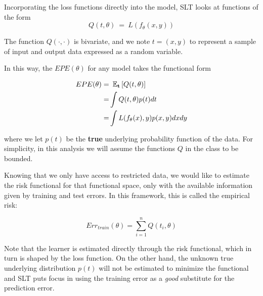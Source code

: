 Incorporating the loss functions directly into the model, SLT looks at functions of the form $$Q(t,\theta) \ = \ L(f_\theta(x,y))$$

The function $Q(\cdot,\cdot)$ is bivariate, and we note $t=(x,y)$ to represent a sample of input and output data expressed as a random variable.%

In this way, the $EPE(\theta)$ for any model takes the functional form


\begin{equation}
\begin{split}
EPE(\theta) = & \ \operatorname{\mathbb{E}}_{\textbf{t}} \left[ Q(t,\theta) \right]\\
= & \int Q(t,\theta) p(t) dt \\
= & \int L(f_\theta(x),y) p(x,y) dx dy
\end{split}
\end{equation}\label{eq:vapnik-risk}

where we let $p(t)$ be the \textbf{true} underlying probability function of the data.
For simplicity, in this analysis we will assume the functions $Q$ in the class to be bounded.

Knowing that we only have access to restricted data, we would like to estimate the risk functional for that functional space, only with the available information given by training and test errors.
In this framework, this is called the empirical risk:

\begin{equation}\label{vapnik-empiricalRisk}
Err_{train}(\theta) = \sum_{i=1}^n Q(t_i,\theta)
\end{equation}

Note that the learner is estimated directly through the risk functional, which in turn is shaped by the loss function.
On the other hand, the unknown true underlying distribution $p(t)$ will not be estimated to minimize the functional and SLT puts focus in using the training error as a \textit{good} substitute for the prediction error.




